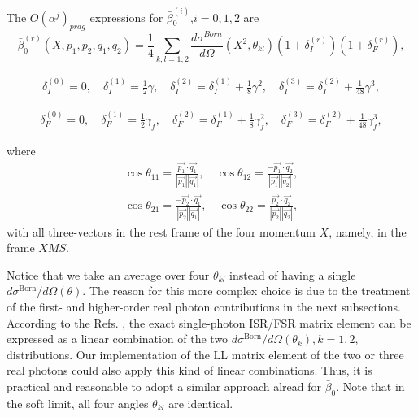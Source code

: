 The $O(\alpha^j)_{prag}$ expressions for $\bar{\beta}_0^{(i)}$,$i=0,1,2$ are
\begin{equation}
\bar{\beta}_0^{(r)}(X,p_1,p_2,q_1,q_2) = \frac{1}{4}\sum_{k,l=1,2}\frac{d\sigma^{Born}}{d\Omega}(X^2, \theta_{kl}) (1+\delta^{(r)}_I)(1+\delta^{(r)}_F),
\end{equation}

\begin{eqnarray}
\delta_I^{(0)}=0, \quad \delta_I^{(1)}=\frac{1}{2}\gamma, \quad \delta_I^{(2)}=\delta_I^{(1)}+\frac{1}{8}\gamma^2, \quad
\delta_I^{(3)}=\delta_I^{(2)}+\frac{1}{48}\gamma^3, 
\end{eqnarray}

\begin{eqnarray}
\delta_F^{(0)}=0, \quad \delta_F^{(1)}=\frac{1}{2}\gamma_f, \quad \delta_F^{(2)}=\delta_F^{(1)}+\frac{1}{8}\gamma^2_f, \quad
\delta_F^{(3)}=\delta_F^{(2)}+\frac{1}{48}\gamma^3_f, 
\end{eqnarray}

where
\begin{eqnarray}
\cos\theta_{11} = \frac{\vec{p_1}\cdot\vec{q_1}}{|\vec{p_1}||\vec{q_1}|},\quad
\cos\theta_{12} = \frac{-\vec{p_1}\cdot\vec{q_2}}{|\vec{p_1}||\vec{q_2}|},\nonumber\\
\cos\theta_{21} = \frac{-\vec{p_2}\cdot\vec{q_1}}{|\vec{p_2}||\vec{q_1}|},\quad
\cos\theta_{22} = \frac{\vec{p_2}\cdot\vec{q_2}}{|\vec{p_2}||\vec{q_2}|},
\end{eqnarray}
with all three-vectors in the rest frame of the four momentum $X$, namely, in the frame $XMS$.

Notice that we take an average over four $\theta_{kl}$ instead of having a single $d\sigma^\text{Born}/d\Omega(\theta)$. The reason for this more complex choice is due to the treatment of the first- and higher-order real photon contributions in the next subsections. According to the Refs. \cite{BK,BKJ}, the exact single-photon ISR/FSR matrix element can be expressed as a linear combination of the two $d\sigma^\text{Born} /d\Omega (\theta_k), k=1,2,$ distributions. Our implementation of the LL matrix element of the two or three real photons could also apply this kind of linear combinations. Thus, it is practical and reasonable to adopt a similar approach alread for $\bar{\beta}_0$.
Note that in the soft limit, all four angles $\theta_{kl}$ are identical. 

